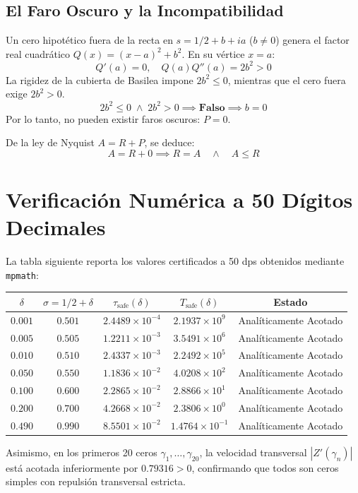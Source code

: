 \documentclass[11pt,a4paper]{article}
\theoremstyle{plain}
\theoremstyle{definition}
\begin{document}
\subsection{El Faro Oscuro y la Incompatibilidad}
Un cero hipotético fuera de la recta en $s = 1/2 + b + ia$ ($b \ne 0$) genera el factor real cuadrático $Q(x) = (x-a)^2 + b^2$. En su vértice $x = a$:
$$Q'(a) = 0, \quad Q(a) Q''(a) = 2b^2 > 0$$
La rigidez de la cubierta de Basilea impone $2b^2 \le 0$, mientras que el cero fuera exige $2b^2 > 0$.
$$2b^2 \le 0 \;\land\; 2b^2 > 0 \implies \mathbf{Falso} \implies b = 0$$
Por lo tanto, no pueden existir faros oscuros: $P = 0$.

De la ley de Nyquist $A = R + P$, se deduce:
$$A = R + 0 \implies R = A \quad \land \quad A \le R$$

\section{Verificación Numérica a 50 Dígitos Decimales}

La tabla siguiente reporta los valores certificados a 50 dps obtenidos mediante \texttt{mpmath}:
\begin{center}
\begin{tabular}{ccccc}
\toprule
$\delta$ & $\sigma = 1/2 + \delta$ & $\tau_{\text{safe}}(\delta)$ & $T_{\text{safe}}(\delta)$ & Estado \\
\midrule
$0.001$ & $0.501$ & $2.4489 \times 10^{-4}$ & $2.1937 \times 10^{9}$ & Analíticamente Acotado \\
$0.005$ & $0.505$ & $1.2211 \times 10^{-3}$ & $3.5491 \times 10^{6}$ & Analíticamente Acotado \\
$0.010$ & $0.510$ & $2.4337 \times 10^{-3}$ & $2.2492 \times 10^{5}$ & Analíticamente Acotado \\
$0.050$ & $0.550$ & $1.1836 \times 10^{-2}$ & $4.0208 \times 10^{2}$ & Analíticamente Acotado \\
$0.100$ & $0.600$ & $2.2865 \times 10^{-2}$ & $2.8866 \times 10^{1}$ & Analíticamente Acotado \\
$0.200$ & $0.700$ & $4.2668 \times 10^{-2}$ & $2.3806 \times 10^{0}$ & Analíticamente Acotado \\
$0.490$ & $0.990$ & $8.5501 \times 10^{-2}$ & $1.4764 \times 10^{-1}$ & Analíticamente Acotado \\
\bottomrule
\end{tabular}
\end{center}

Asimismo, en los primeros 20 ceros $\gamma_1, \dots, \gamma_{20}$, la velocidad transversal $|Z'(\gamma_n)|$ está acotada inferiormente por $0.79316 > 0$, confirmando que todos son ceros simples con repulsión transversal estricta.
\end{document}
